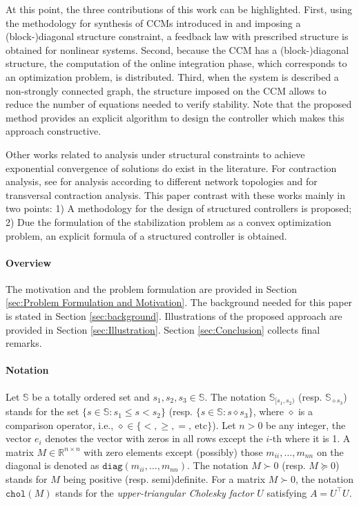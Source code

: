 \documentclass[10pt,twocolumn,twoside]{IEEEtran}
\theoremstyle{plain}
\theoremstyle{definition}
\theoremstyle{remark}
\begin{document}
At this point, the three contributions of this work can be highlighted. First, using the methodology for synthesis of CCMs introduced in \cite{Manchester2014a} and imposing a (block-)diagonal structure constraint, a feedback law with prescribed structure is obtained for nonlinear systems. Second, because the CCM has a (block-)diagonal structure, the computation of the online integration phase, which corresponds to an optimization problem, is distributed. Third, when the system is described a non-strongly connected graph, the structure imposed on the CCM allows to reduce the number of equations needed to  verify stability. Note that the proposed method provides an explicit algorithm to design the controller which makes this approach constructive.

Other works related to analysis under structural constraints to achieve exponential convergence of solutions do exist in the literature. For contraction analysis, see \cite{Aminzare2014a} for analysis according to different network topologies and \cite{Andrieu2016} for transversal contraction analysis. This paper contrast with these works mainly in two points: 1) A  methodology for the design of structured controllers is proposed; 2) Due the formulation of the stabilization problem as a convex optimization problem, an explicit formula of a structured controller is obtained.

\paragraph{Overview} The motivation and the problem formulation are provided in Section \ref{sec:Problem Formulation and Motivation}. The background needed for this paper is stated in Section \ref{sec:background}. Illustrations of the proposed approach are provided in Section \ref{sec:Illustration}. Section \ref{sec:Conclusion} collects final remarks.

\paragraph{Notation} Let $\mathbb{S}$ be a totally ordered set and $s_1,s_2,s_3\in\mathbb{S}$. The notation $\mathbb{S}_{[s_1,s_2)}$ (resp. $\mathbb{S}_{\diamond s_3}$) stands for the set $\{s\in\mathbb{S}:s_1\leq s< s_2\}$ (resp. $\{s\in\mathbb{S}:s\diamond s_3\}$, where $\diamond$ is a comparison operator, i.e., $\diamond\in\{<,\geq,=,\ \text{etc}\}$). Let $n>0$ be any integer, the vector $e_i$ denotes the vector with zeros in all rows except the $i$-th where it is 1. A matrix $M\in\mathbb{R}^{n\times n}$ with zero elements except (possibly) those  $m_{ii},\ldots,m_{nn}$ on the diagonal is denoted as $\mathbin{\mathtt{diag}}(m_{ii},\ldots,m_{nn})$. The notation $M\succ 0$ (resp. $M\succeq 0$) stands for $M$ being positive (resp. semi)definite. For a matrix $M\succ0$, the notation $\mathbin{\mathtt{chol}}(M)$ stands for the \emph{upper-triangular Cholesky factor $U$} satisfying $A=U^\top U$.
\end{document}
